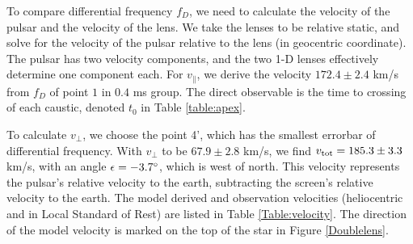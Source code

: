 \documentclass[useAMS,usenatbib]{mn2e}
\begin{document}
To compare differential frequency $f_D$, we need to calculate the velocity of the pulsar and the velocity of the lens. We take the lenses to be relative static, and solve for the velocity of the pulsar relative to the lens (in geocentric coordinate). The pulsar has two velocity components, and the two 1-D lenses effectively determine one component each.
For $v_{\parallel}$, we derive the velocity $172.4 \pm 2.4$ km/s from $f_D$ of point $1$ in $0.4$ ms group.  The direct observable is the time to crossing of each caustic, denoted $t_0$ in Table \ref{table:apex}. 

To calculate $v_{\bot}$, we choose the point 4', which has the smallest errorbar of differential frequency.
With $v_{\bot}$ to be $67.9\pm 2.8$ km/s, we find $v_{\rm tot}=185.3 \pm 3.3$ km/s, with an angle $\epsilon=-3.7\degree$, which is west of north. This velocity represents the pulsar's relative velocity to the earth, subtracting the screen's relative velocity to the earth. The model derived and observation velocities (heliocentric and in Local Standard of Rest) are listed in Table \ref{Table:velocity}. The direction of the model velocity is marked on the top of the star in Figure \ref{Doublelens}.

\end{document}
